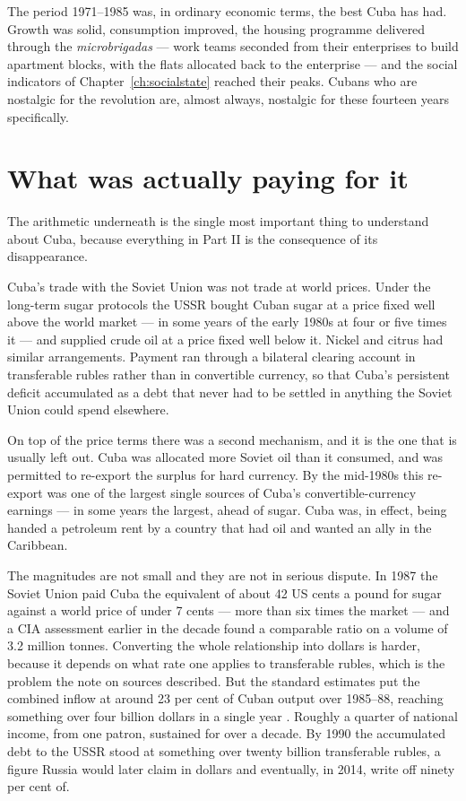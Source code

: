 The period 1971--1985 was, in ordinary economic terms, the best Cuba has had.
Growth was solid, consumption improved, the housing programme delivered
through the \emph{microbrigadas} --- work teams seconded from their enterprises
to build apartment blocks, with the flats allocated back to the enterprise ---
and the social indicators of Chapter~\ref{ch:socialstate} reached their peaks.
Cubans who are nostalgic for the revolution are, almost always, nostalgic for
these fourteen years specifically.

\section{What was actually paying for it}

The arithmetic underneath is the single most important thing to understand
about Cuba, because everything in Part II is the consequence of its
disappearance.

Cuba's trade with the Soviet Union was not trade at world prices. Under the
long-term sugar protocols the USSR bought Cuban sugar at a price fixed well
above the world market --- in some years of the early 1980s at four or five
times it --- and supplied crude oil at a price fixed well below it. Nickel and
citrus had similar arrangements. Payment ran through a bilateral clearing
account in transferable rubles rather than in convertible currency, so that
Cuba's persistent deficit accumulated as a debt that never had to be settled in
anything the Soviet Union could spend elsewhere.

On top of the price terms there was a second mechanism, and it is the one that
is usually left out. Cuba was allocated more Soviet oil than it consumed, and
was permitted to re-export the surplus for hard currency. By the mid-1980s this
re-export was one of the largest single sources of Cuba's convertible-currency
earnings --- in some years the largest, ahead of sugar.\unv{} Cuba was, in
effect, being handed a petroleum rent by a country that had oil and wanted an
ally in the Caribbean.

The magnitudes are not small and they are not in serious dispute. In 1987 the
Soviet Union paid Cuba the equivalent of about 42 US cents a pound for sugar
against a world price of under 7 cents --- more than six times the market ---
and a CIA assessment earlier in the decade found a comparable ratio on a volume
of 3.2 million tonnes. Converting the whole relationship into dollars is harder,
because it depends on what rate one applies to transferable rubles, which is the
problem the note on sources described. But the standard estimates put the
combined inflow at around 23 per cent of Cuban output over 1985--88, reaching
something over four billion dollars in a single year \citep{mesalago2000}.\unv{}
Roughly a quarter of national income, from one patron, sustained for over a
decade. By 1990 the accumulated debt to the USSR
stood at something over twenty billion transferable rubles, a figure Russia
would later claim in dollars and eventually, in 2014, write off ninety per cent
of.

